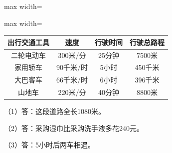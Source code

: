 
\begingroup\color{answerred}\par\smallskip\noindent\begin{adjustbox}{max width=\linewidth}\begin{adjustbox}{max width=\linewidth}\begin{tabular}{c|c|c|c}
\hline
出行交通工具&速度&行驶时间&行驶总路程\\\hline
二轮电动车&300米/分&25分钟&7500米\\
家用轿车&90千米/时&5小时&450千米\\
大巴客车&66千米/时&6小时&396千米\\
山地车&220米/分&40分钟&8800米\\\hline
\end{tabular}\end{adjustbox}\end{adjustbox}\par\smallskip\par\endgroup
{}
\begingroup\color{answerred}\noindent（1）答：这段道路全长1080米。\par
\noindent（2）答：采购湿巾比采购洗手液多花240元。\par
\noindent（3）答：5小时后两车相遇。\par\par\endgroup
